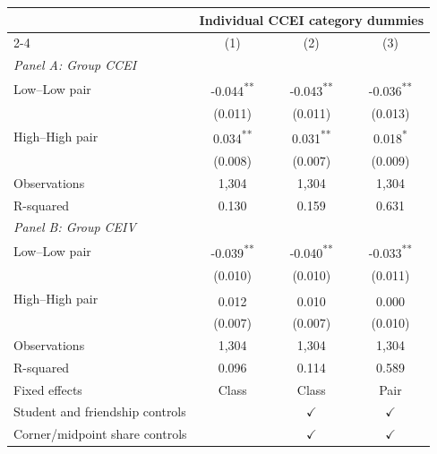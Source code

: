 \begin{tabular}{lccc}\toprule \hline
& \multicolumn{3}{c}{Individual CCEI category dummies}\\
\cmidrule(lr){2-4}
& (1) & (2) & (3)\\\midrule
\multicolumn{4}{l}{\textit{Panel A: Group CCEI}}\\[3pt]
Low--Low pair & -0.044\textsuperscript{**} & -0.043\textsuperscript{**} & -0.036\textsuperscript{**}\\
 & (0.011) & (0.011) & (0.013)\\
High--High pair & 0.034\textsuperscript{**} & 0.031\textsuperscript{**} & 0.018\textsuperscript{*}\\
 & (0.008) & (0.007) & (0.009)\\
Observations & 1,304 & 1,304 & 1,304\\
R-squared & 0.130 & 0.159 & 0.631\\
\midrule
\multicolumn{4}{l}{\textit{Panel B: Group CEIV}}\\[3pt]
Low--Low pair & -0.039\textsuperscript{**} & -0.040\textsuperscript{**} & -0.033\textsuperscript{**}\\
 & (0.010) & (0.010) & (0.011)\\
High--High pair & 0.012\textsuperscript{} & 0.010\textsuperscript{} & 0.000\textsuperscript{}\\
 & (0.007) & (0.007) & (0.010)\\
Observations & 1,304 & 1,304 & 1,304\\
R-squared & 0.096 & 0.114 & 0.589\\
\midrule
Fixed effects & Class & Class & Pair\\
Student and friendship controls &  & $\checkmark$ & $\checkmark$\\
Corner/midpoint share controls &  & $\checkmark$ & $\checkmark$\\
\bottomrule\end{tabular}

